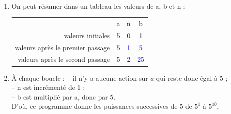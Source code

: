 \begin{corrige}
\ \\ [-5mm]
   \begin{enumerate}
      \item On peut résumer dans un tableau les valeurs de a, b et n : \\  [1mm]
      \qquad
      {
         \begin{tabular}{r|C{0.8}|C{0.8}|C{0.8}|}
            & a & n & b \\
            valeurs initiales & 5 & 0 & 1 \\
            valeurs après le premier passage & \textcolor{blue}{5} & \textcolor{blue}{1} & \textcolor{blue}{5} \\
            valeurs après le second passage & \textcolor{blue}{5} & \textcolor{blue}{2} & \textcolor{blue}{25} \\
         \end{tabular}
      } \medskip
   \item À chaque boucle :
       -- il n'y a aucune action sur $a$ qui reste donc égal à 5 ; \\
       -- n est incrémenté de 1 ; \\
       -- b est multiplié par a, donc par 5. \\
       D'où, {\blue ce programme donne les puissances successives de 5 de $5^1$ à $5^{10}$.}
   \end{enumerate}
\end{corrige}

\bigskip


